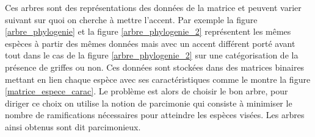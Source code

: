 Ces arbres sont des représentations des données de la matrice et peuvent varier suivant sur quoi on cherche à mettre l'accent. Par exemple la figure \ref{arbre_phylogenie} et la figure \ref{arbre_phylogenie_2} représentent les mêmes espèces à partir des mêmes données mais avec un accent différent porté avant tout dans le cas de la figure \ref{arbre_phylogenie_2} sur une catégorisation de la présence de griffes ou non. Ces données sont stockées dans des matrices binaires mettant en lien chaque espèce avec ses caractéristiques comme le montre la figure \ref{matrice_espece_carac}. Le problème est alors de choisir le bon arbre, pour diriger ce choix on utilise la notion de parcimonie qui consiste à minimiser le nombre de ramifications nécessaires pour atteindre les espèces visées. Les arbres ainsi obtenus sont dit parcimonieux.

